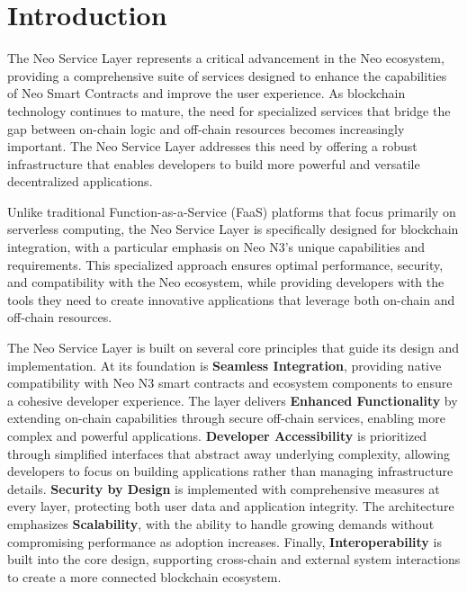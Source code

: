 \documentclass[11pt]{article}
\begin{document}
\tableofcontents
\pagebreak

\section{Introduction}
\label{subsec:nsl-intro}

The Neo Service Layer represents a critical advancement in the Neo ecosystem, providing a comprehensive suite of services designed to enhance the capabilities of Neo Smart Contracts and improve the user experience. As blockchain technology continues to mature, the need for specialized services that bridge the gap between on-chain logic and off-chain resources becomes increasingly important. The Neo Service Layer addresses this need by offering a robust infrastructure that enables developers to build more powerful and versatile decentralized applications.

Unlike traditional Function-as-a-Service (FaaS) platforms that focus primarily on serverless computing, the Neo Service Layer is specifically designed for blockchain integration, with a particular emphasis on Neo N3's unique capabilities and requirements. This specialized approach ensures optimal performance, security, and compatibility with the Neo ecosystem, while providing developers with the tools they need to create innovative applications that leverage both on-chain and off-chain resources.

The Neo Service Layer is built on several core principles that guide its design and implementation. At its foundation is \textbf{Seamless Integration}, providing native compatibility with Neo N3 smart contracts and ecosystem components to ensure a cohesive developer experience. The layer delivers \textbf{Enhanced Functionality} by extending on-chain capabilities through secure off-chain services, enabling more complex and powerful applications. \textbf{Developer Accessibility} is prioritized through simplified interfaces that abstract away underlying complexity, allowing developers to focus on building applications rather than managing infrastructure details. \textbf{Security by Design} is implemented with comprehensive measures at every layer, protecting both user data and application integrity. The architecture emphasizes \textbf{Scalability}, with the ability to handle growing demands without compromising performance as adoption increases. Finally, \textbf{Interoperability} is built into the core design, supporting cross-chain and external system interactions to create a more connected blockchain ecosystem.
\end{document}
